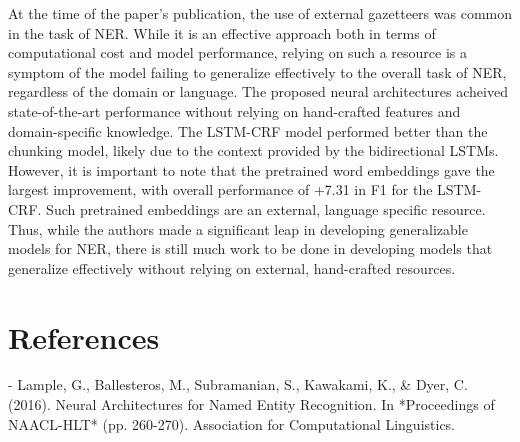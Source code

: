 \documentclass[11pt]{article}
\begin{document}
At the time of the paper's
publication, the use of external gazetteers was common in the 
task of NER. While it is an effective approach
both in terms of computational cost and model performance, 
relying on such a resource is a symptom
of the model failing to generalize effectively to the overall
task of NER, regardless of the domain or language.
The proposed neural architectures acheived
state-of-the-art performance without relying on hand-crafted features and
domain-specific knowledge. The LSTM-CRF model performed better than
the chunking model, likely due to the
context provided by the bidirectional LSTMs.
However, it is important to note that the
pretrained word embeddings gave the largest improvement,
with overall performance of +7.31 in F1 for the LSTM-CRF. 
Such pretrained embeddings are an external, 
language specific resource. Thus, while
the authors made a significant leap
in developing generalizable models
for NER, there is still much work to be done
in developing models that generalize effectively
without relying on external, hand-crafted resources.

\section*{References}
- Lample, G., Ballesteros, M., Subramanian, S., Kawakami, K., \& Dyer, C. (2016). Neural Architectures for Named Entity Recognition. In *Proceedings of NAACL-HLT* (pp. 260-270). Association for Computational Linguistics.
\end{document}
